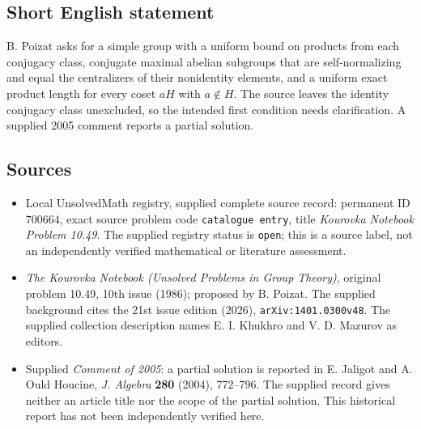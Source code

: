 \documentclass[11pt]{article}
\begin{document}
\subsection{Short English statement}
B. Poizat asks for a simple group with a uniform bound on products from each conjugacy class, conjugate maximal abelian subgroups that are self-normalizing and equal the centralizers of their nonidentity elements, and a uniform exact product length for every coset \(aH\) with \(a\notin H\). The source leaves the identity conjugacy class unexcluded, so the intended first condition needs clarification. A supplied 2005 comment reports a partial solution.
\subsection{Sources}
\begin{itemize}
\item Local UnsolvedMath registry, supplied complete source record: permanent ID \(700664\), exact source problem code \texttt{catalogue entry}, title \emph{Kourovka Notebook Problem 10.49}. The supplied registry status is \texttt{open}; this is a source label, not an independently verified mathematical or literature assessment.
\item \emph{The Kourovka Notebook (Unsolved Problems in Group Theory)}, original problem 10.49, 10th issue (1986); proposed by B. Poizat. The supplied background cites the 21st issue edition (2026), \texttt{arXiv:1401.0300v48}. The supplied collection description names E. I. Khukhro and V. D. Mazurov as editors.
\item Supplied \emph{Comment of 2005}: a partial solution is reported in E. Jaligot and A. Ould Houcine, \emph{J. Algebra} \textbf{280} (2004), 772--796. The supplied record gives neither an article title nor the scope of the partial solution. This historical report has not been independently verified here.
\end{itemize}
\end{document}
